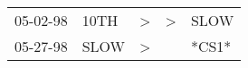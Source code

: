 \begin{supertabular}{p{0.07\textwidth}p{0.06\textwidth}p{0.02\textwidth}p{0.02\textwidth}p{0.06\textwidth}}
 05-02-98\textsuperscript{} &  10TH\textsuperscript{} &  \textgreater &  \textgreater &  SLOW\textsuperscript{} \\
 05-27-98\textsuperscript{} &  SLOW\textsuperscript{} &  \textgreater &               &                   *CS1* \\
\end{supertabular}
